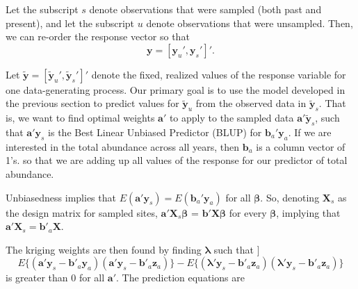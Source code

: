 \documentclass[]{interact}
\theoremstyle{plain}%
\theoremstyle{definition}
\theoremstyle{remark}
\begin{document}
Let the subscript \(s\) denote observations that were sampled (both past
and present), and let the subscript \(u\) denote observations that were
unsampled. Then, we can re-order the response vector so that \mbox{}
\begin{equation}
\mathbf{y} = [\mathbf{y}_u', \mathbf{y}_s']'.
\end{equation}

Let
\(\mathbf{\tilde{y}} = [\mathbf{\tilde{y}}_u', \mathbf{\tilde{y}}_s']'\)
denote the fixed, realized values of the response variable for one
data-generating process. Our primary goal is to use the model developed
in the previous section to predict values for \(\mathbf{\tilde{y}}_{u}\)
from the observed data in \(\mathbf{\tilde{y}}_{s}\). That is, we want
to find optimal weights \(\mathbf{a}'\) to apply to the sampled data
\(\mathbf{a}' \mathbf{\tilde{y}}_s\), such that
\(\mathbf{a}' \mathbf{y}_s\) is the Best Linear Unbiased Predictor
(BLUP) for \(\mathbf{b}_a' \mathbf{y}_a\). If we are interested in the
total abundance across all years, then \(\mathbf{b}_a\) is a column
vector of 1's. so that we are adding up all values of the response for
our predictor of total abundance.

Unbiasedness implies that
\(E(\mathbf{a'}\mathbf{y}_s) = E(\mathbf{b}_a'\mathbf{y}_a)\) for all
\(\bm{\beta}\). So, denoting \(\mathbf{X}_s\) as the design matrix for
sampled sites, \(\mathbf{a'} \mathbf{X}_s \bm{\beta}\) =
\(\mathbf{b'} \mathbf{X} \bm{\beta}\) for every \(\bm{\beta}\), implying
that \(\mathbf{a'} \mathbf{X}_s = \mathbf{b'}_a \mathbf{X}\).

The kriging weights are then found by finding \(\bm{\lambda}\) such that
\mbox{]} \begin{equation}
E\{(\mathbf{a'}\mathbf{y}_s - \mathbf{b'}_a \mathbf{y}_a)(\mathbf{a'}\mathbf{y}_s - \mathbf{b'}_a \mathbf{z}_a)\} - E\{(\bm{\lambda'}\mathbf{y}_s - \mathbf{b'}_a \mathbf{z}_a)(\bm{\lambda}'\mathbf{y}_s - \mathbf{b'}_a \mathbf{z}_a)\}
\end{equation} \noindent is greater than 0 for all \(\mathbf{a'}\). The
prediction equations are
\end{document}
